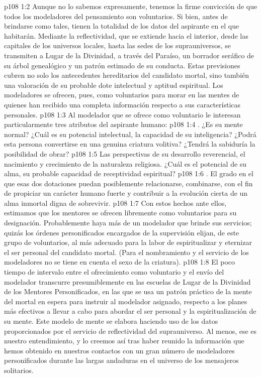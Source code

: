 \vs p108 1:2 Aunque no lo sabemos expresamente, tenemos la firme convicción de que todos los modeladores del pensamiento son voluntarios. Si bien, antes de brindarse como tales, tienen la totalidad de los datos del aspirante en el que habitarán. Mediante la reflectividad, que se extiende hacia el interior, desde las capitales de los universos locales, hasta las sedes de los suprauniversos, se transmiten a Lugar de la Divinidad, a través del Paraíso, un borrador seráfico de su árbol genealógico y un patrón estimado de su conducta. Estas previsiones cubren no solo los antecedentes hereditarios del candidato mortal, sino también una valoración de su probable dote intelectual y aptitud espiritual. Los modeladores se ofrecen, pues, como voluntarios para morar en las mentes de quienes han recibido una completa información respecto a sus características personales.
\vs p108 1:3 Al modelador que se ofrece como voluntario le interesan particularmente tres atributos del aspirante humano:
\vs p108 1:4 . ¿Es su mente normal? ¿Cuál es su potencial intelectual, la capacidad de su inteligencia? ¿Podrá esta persona convertirse en una genuina criatura volitiva? ¿Tendrá la sabiduría la posibilidad de obrar?
\vs p108 1:5  Las perspectivas de su desarrollo reverencial, el nacimiento y crecimiento de la naturaleza religiosa. ¿Cuál es el potencial de su alma, su probable capacidad de receptividad espiritual?
\vs p108 1:6 . El grado en el que esas dos dotaciones puedan posiblemente relacionarse, combinarse, con el fin de propiciar un carácter humano fuerte y contribuir a la evolución cierta de un alma inmortal digna de sobrevivir.
\vs p108 1:7 \pc Con estos hechos ante ellos, estimamos que los mentores se ofrecen libremente como voluntarios para su designación. Probablemente haya más de un modelador que brinde sus servicios; quizás los órdenes personificados encargados de la supervisión elijan, de este grupo de voluntarios, al más adecuado para la labor de espiritualizar y eternizar el ser personal del candidato mortal. (Para el nombramiento y el servicio de los modeladores no se tiene en cuenta el sexo de la criatura).
\vs p108 1:8 El poco tiempo de intervalo entre el ofrecimiento como voluntario y el envío del modelador transcurre presumiblemente en las escuelas de Lugar de la Divinidad de los Mentores Personificados, en las que se usa un patrón práctico de la mente del mortal en espera para instruir al modelador asignado, respecto a los planes más efectivos a llevar a cabo para abordar el ser personal y la espiritualización de su mente. Este modelo de mente se elabora haciendo uso de los datos proporcionados por el servicio de reflectividad del suprauniverso. Al menos, ese es nuestro entendimiento, y lo creemos así tras haber reunido la información que hemos obtenido en nuestros contactos con un gran número de modeladores personificados durante las largas andaduras en el universo de los mensajeros solitarios.
